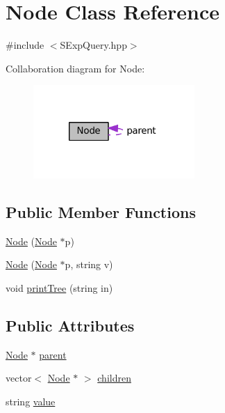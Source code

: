 \hypertarget{class_node}{\section{Node Class Reference}
\label{class_node}
}


{\ttfamily \#include $<$S\-Exp\-Query.\-hpp$>$}



Collaboration diagram for Node\-:\nopagebreak
\begin{figure}[H]
\begin{center}
\leavevmode
\includegraphics[width=174pt]{class_node__coll__graph}
\end{center}
\end{figure}
\subsection*{Public Member Functions}
\begin{DoxyCompactItemize}
\item 
\hyperlink{class_node_a8364d212066287c22cc5e27b8f8fe730}{Node} (\hyperlink{class_node}{Node} $\ast$p)
\item 
\hyperlink{class_node_a5c7d9a8b91f994ab038e294833187523}{Node} (\hyperlink{class_node}{Node} $\ast$p, string v)
\item 
void \hyperlink{class_node_a3f7b42f5146c6450795964929f7f8f56}{print\-Tree} (string in)
\end{DoxyCompactItemize}
\subsection*{Public Attributes}
\begin{DoxyCompactItemize}
\item 
\hyperlink{class_node}{Node} $\ast$ \hyperlink{class_node_ad8184598cdea70e4bbdfd76f2b0f9e85}{parent}
\item 
vector$<$ \hyperlink{class_node}{Node} $\ast$ $>$ \hyperlink{class_node_a4403c570a373595bc3f82a8ca0bd2e61}{children}
\item 
string \hyperlink{class_node_afbfe6bbcc5e6d53bb23ff4c29c178596}{value}
\end{DoxyCompactItemize}


